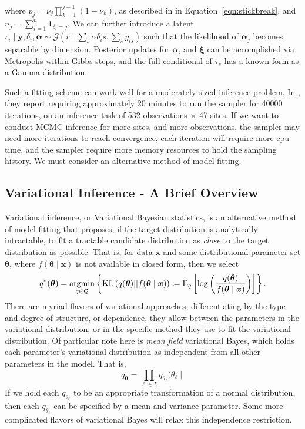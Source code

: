     where $p_j = \nu_j\prod_{k=1}^{j-1}(1 - \nu_k)$,  as described in in 
    Equation~\eqref{eqn:stickbreak}, and $n_j = \sum_{i = 1}^n\bm{1}_{\delta_i = j}$.
    We can further introduce a latent $r_i\mid \bm{y}, \delta_i,\bm{\alpha} \sim 
        \mathcal{G}\left(r\mid \sum_s \alpha{\delta_is},\sum_s y_{is}\right)$ such that the
    likelihood of $\bm{\alpha}_j$ becomes separable by dimension.  Posterior updates 
    for $\bm{\alpha}$, and $\bm{\xi}$ can be accomplished via Metropolis-within-Gibbs steps,
    and the full conditional of $\tau_s$ has a known form as a Gamma distribution.

Such a fitting scheme can work well for a moderately sized inference problem.  In \cite{trubey:pg},
    they report requiring approximately \num{20} minutes to run the sampler for \num{40000} iterations, 
    on an inference task of \num{532} observations $\times$ \num{47} sites.  If we want to conduct
    MCMC inference for more sites, and more observations, the sampler may need more iterations to
    reach convergence, each iteration will require more cpu time, and the sampler require more 
    memory resources to hold the sampling history.  We must consider an alternative method of 
    model fitting.

\subsection{Variational Inference - A Brief Overview}
Variational inference, or Variational Bayesian statistics, is an alternative method of 
    model-fitting that proposes, if the target distribution is analytically intractable,
    to fit a tractable candidate distribution as \emph{close} to the target distribution
    as possible.  That is, for data $\bm{x}$ and some distributional parameter set $\bm{\theta}$,
    where $f(\bm{\theta}\mid \bm{x})$ is not available in closed form, then we select
    \begin{equation}
        \label{eqn:optimalq}
        q^*(\bm{\theta}) = \operatorname*{argmin}_{q\in\mathcal{Q}}\left\lbrace
        \text{KL}\left(q(\bm{\theta})||f(\bm{\theta}\mid\bm{x})\right) 
        \coloneqq
        \text{E}_{q}\left[\log\left(
        \frac{q(\bm{\theta})}{f(\bm{\theta}\mid\bm{x})}
        \right)\right]
        \right\rbrace.
    \end{equation}
    There are myriad flavors of variational approaches, differentiating by
    the type and degree of structure, or dependence, they allow between the parameters in
    the variational distribution, or in the specific method they use to fit the variational
    distribution.  Of particular note here is \emph{mean field} variational Bayes, which 
    holds each parameter's variational distribution as independent from all other parameters 
    in the model.  That is,
    \[
        q_{\bm{\theta}} = \prod_{\ell \in L}q_{\theta_{\ell}}(\theta_{\ell}\mid
    \]
    If we hold each $q_{\theta_{\ell}}$ to be an appropriate transformation of a normal
    distribution, then each $q_{\theta_{\ell}}$ can be specified by a mean and variance 
    parameter. Some \needcite more complicated flavors of variational Bayes will relax 
    this independence restriction.

